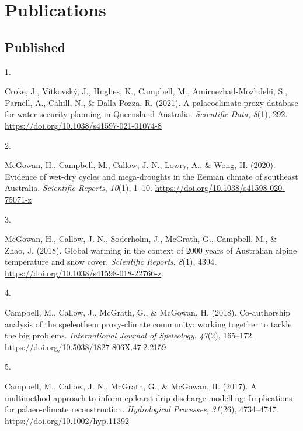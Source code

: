 \documentclass[11pt,a4paper,]{moderncv}
\newlength{\csllabelwidth}
\newcommand{\CSLLeftMargin}[1]{\parbox[t]{\csllabelwidth}{#1}}
\newcommand{\CSLRightInline}[1]{\parbox[t]{\linewidth - \csllabelwidth}{#1}}
\begin{document}
\hypertarget{publications}{%
\section{Publications}\label{publications}}

\hypertarget{published}{%
\subsection{Published}\label{published}}

\hypertarget{bibliography}{}
\leavevmode{}%
\CSLLeftMargin{1. }
\CSLRightInline{Croke, J., Vítkovský, J., Hughes, K., Campbell, M.,
Amirnezhad-Mozhdehi, S., Parnell, A., Cahill, N., \& Dalla Pozza, R.
(2021). A palaeoclimate proxy database for water security planning in
Queensland Australia. \emph{Scientific Data}, \emph{8}(1), 292.
\url{https://doi.org/10.1038/s41597-021-01074-8}}

\leavevmode{}%
\CSLLeftMargin{2. }
\CSLRightInline{McGowan, H., Campbell, M., Callow, J. N., Lowry, A., \&
Wong, H. (2020). Evidence of wet-dry cycles and mega-droughts in the
Eemian climate of southeast Australia. \emph{Scientific Reports},
\emph{10}(1), 1--10. \url{https://doi.org/10.1038/s41598-020-75071-z}}

\leavevmode{}%
\CSLLeftMargin{3. }
\CSLRightInline{McGowan, H., Callow, J. N., Soderholm, J., McGrath, G.,
Campbell, M., \& Zhao, J. (2018). Global warming in the context of 2000
years of Australian alpine temperature and snow cover. \emph{Scientific
Reports}, \emph{8}(1), 4394.
\url{https://doi.org/10.1038/s41598-018-22766-z}}

\leavevmode{}%
\CSLLeftMargin{4. }
\CSLRightInline{Campbell, M., Callow, J., McGrath, G., \& McGowan, H.
(2018). Co-authorship analysis of the speleothem proxy-climate
community: working together to tackle the big problems.
\emph{International Journal of Speleology}, \emph{47}(2), 165--172.
\url{https://doi.org/10.5038/1827-806X.47.2.2159}}

\leavevmode{}%
\CSLLeftMargin{5. }
\CSLRightInline{Campbell, M., Callow, J. N., McGrath, G., \& McGowan, H.
(2017). A multimethod approach to inform epikarst drip discharge
modelling: Implications for palaeo-climate reconstruction.
\emph{Hydrological Processes}, \emph{31}(26), 4734--4747.
\url{https://doi.org/10.1002/hyp.11392}}
\end{document}
